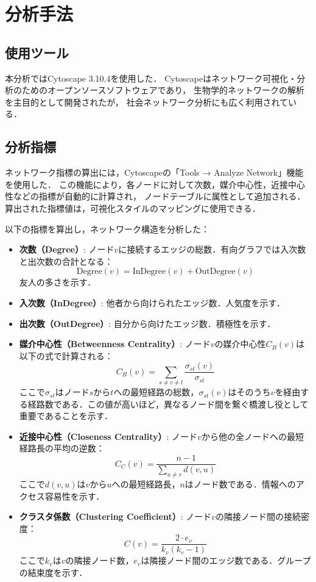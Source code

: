 \section{分析手法}

\subsection{使用ツール}

本分析ではCytoscape 3.10.4を使用した．
Cytoscapeはネットワーク可視化・分析のためのオープンソースソフトウェアであり，
生物学的ネットワークの解析を主目的として開発されたが，
社会ネットワーク分析にも広く利用されている．

\subsection{分析指標}

ネットワーク指標の算出には，Cytoscapeの「Tools → Analyze Network」機能を使用した．
この機能により，各ノードに対して次数，媒介中心性，近接中心性などの指標が自動的に計算され，
ノードテーブルに属性として追加される．
算出された指標値は，可視化スタイルのマッピングに使用できる．

以下の指標を算出し，ネットワーク構造を分析した：

\begin{itemize}
  \item \textbf{次数（Degree）}: ノード$v$に接続するエッジの総数．有向グラフでは入次数と出次数の合計となる：
  \[
    \text{Degree}(v) = \text{InDegree}(v) + \text{OutDegree}(v)
  \]
  友人の多さを示す．
  \item \textbf{入次数（InDegree）}: 他者から向けられたエッジ数．人気度を示す．
  \item \textbf{出次数（OutDegree）}: 自分から向けたエッジ数．積極性を示す．
  \item \textbf{媒介中心性（Betweenness Centrality）}: ノード$v$の媒介中心性$C_B(v)$は以下の式で計算される：
  \[
    C_B(v) = \sum_{s \neq v \neq t} \frac{\sigma_{st}(v)}{\sigma_{st}}
  \]
  ここで$\sigma_{st}$はノード$s$から$t$への最短経路の総数，$\sigma_{st}(v)$はそのうち$v$を経由する経路数である．この値が高いほど，異なるノード間を繋ぐ橋渡し役として重要であることを示す．
  \item \textbf{近接中心性（Closeness Centrality）}: ノード$v$から他の全ノードへの最短経路長の平均の逆数：
  \[
    C_C(v) = \frac{n-1}{\sum_{u \neq v} d(v, u)}
  \]
  ここで$d(v,u)$は$v$から$u$への最短経路長，$n$はノード数である．情報へのアクセス容易性を示す．
  \item \textbf{クラスタ係数（Clustering Coefficient）}: ノード$v$の隣接ノード間の接続密度：
  \[
    C(v) = \frac{2 \cdot e_v}{k_v(k_v - 1)}
  \]
  ここで$k_v$は$v$の隣接ノード数，$e_v$は隣接ノード間のエッジ数である．グループの結束度を示す．
\end{itemize}

